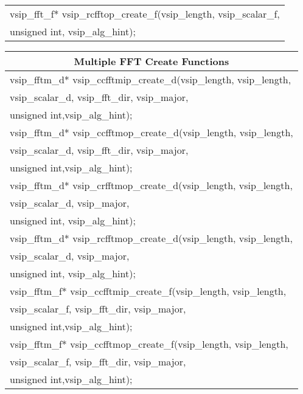 {\begin{tabular}[H]{|l|}
vsip\_fft\_f* vsip\_rcfftop\_create\_f(vsip\_length, vsip\_scalar\_f,\\*\hspace{.7cm}unsigned int, vsip\_alg\_hint);\\\hline
\end{tabular}
\newline\hspace*{0.5cm} 
\begin{tabular}[H]{|l|}
\multicolumn{1}{c}{\rmfamily \bfseries Multiple FFT Create Functions}\\ \hline
vsip\_fftm\_d* vsip\_ccfftmip\_create\_d(vsip\_length, vsip\_length,\\*\hspace{.7cm}vsip\_scalar\_d, vsip\_fft\_dir, vsip\_major,\\*\hspace{.7cm} unsigned int,vsip\_alg\_hint);\\
vsip\_fftm\_d* vsip\_ccfftmop\_create\_d(vsip\_length, vsip\_length,\\*\hspace{.7cm}vsip\_scalar\_d, vsip\_fft\_dir, vsip\_major,\\*\hspace{.7cm} unsigned int,vsip\_alg\_hint);\\
vsip\_fftm\_d* vsip\_crfftmop\_create\_d(vsip\_length, vsip\_length,\\*\hspace{.7cm}vsip\_scalar\_d, vsip\_major,\\*\hspace{.7cm} unsigned int, vsip\_alg\_hint);\\
vsip\_fftm\_d* vsip\_rcfftmop\_create\_d(vsip\_length, vsip\_length,\\*\hspace{.7cm}vsip\_scalar\_d, vsip\_major,\\*\hspace{.7cm} unsigned int, vsip\_alg\_hint);\\
vsip\_fftm\_f* vsip\_ccfftmip\_create\_f(vsip\_length, vsip\_length,\\*\hspace{.7cm}vsip\_scalar\_f, vsip\_fft\_dir, vsip\_major,\\*\hspace{.7cm} unsigned int,vsip\_alg\_hint);\\
vsip\_fftm\_f* vsip\_ccfftmop\_create\_f(vsip\_length, vsip\_length,\\*\hspace{.7cm}vsip\_scalar\_f, vsip\_fft\_dir, vsip\_major,\\*\hspace{.7cm} unsigned int,vsip\_alg\_hint);\\

\end{tabular}}
